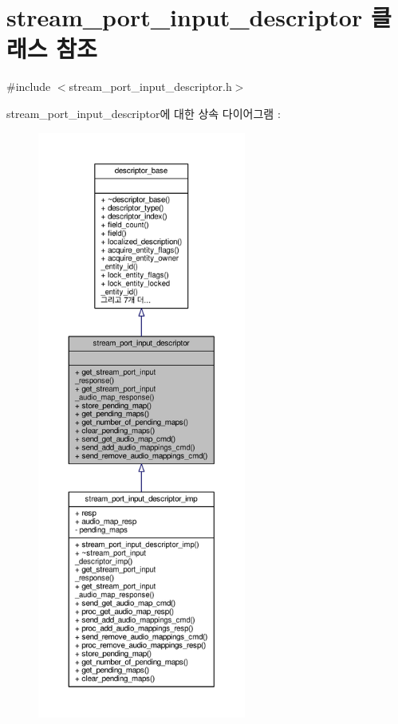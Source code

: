 \hypertarget{classavdecc__lib_1_1stream__port__input__descriptor}{}\section{stream\+\_\+port\+\_\+input\+\_\+descriptor 클래스 참조}
\label{classavdecc__lib_1_1stream__port__input__descriptor}


{\ttfamily \#include $<$stream\+\_\+port\+\_\+input\+\_\+descriptor.\+h$>$}



stream\+\_\+port\+\_\+input\+\_\+descriptor에 대한 상속 다이어그램 \+: 
\nopagebreak
\begin{figure}[H]
\begin{center}
\leavevmode
\includegraphics[height=550pt]{classavdecc__lib_1_1stream__port__input__descriptor__inherit__graph}
\end{center}
\end{figure}


